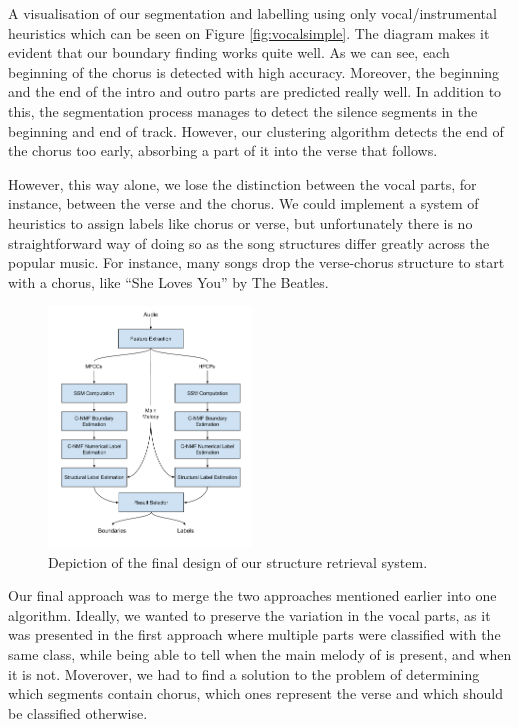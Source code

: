 A visualisation of our segmentation and labelling using only vocal/instrumental heuristics which can be seen on Figure \ref{fig:vocalsimple}. The diagram makes it evident that our boundary finding works quite well. As we can see, each beginning of the chorus is detected with high accuracy. Moreover, the beginning and the end of the intro and outro parts are predicted really well. In addition to this, the segmentation process manages to detect the silence segments in the beginning and end of track. However, our clustering algorithm detects the end of the chorus too early, absorbing a part of it into the verse that follows.

However, this way alone, we lose the distinction between the vocal parts, for instance, between the verse and the chorus. We could implement a system of heuristics to assign labels like chorus or verse, but unfortunately there is no straightforward way of doing so as the song structures differ greatly across the popular music. For instance, many songs drop the verse-chorus structure to start with a chorus, like ``She Loves You'' by The Beatles.

\begin{figure}
\vspace{-30pt}
  \begin{center}
    \includegraphics[width=0.48\textwidth]{Figures/Structure-Retrieval}
  \end{center}
  \caption{Depiction of the final design of our structure retrieval system.}
\label{fig:NMF}
\end{figure}


Our final approach was to merge the two approaches mentioned earlier into one algorithm. Ideally, we wanted to preserve the variation in the vocal parts, as it was presented in the first approach where multiple parts were classified with the same class, while being able to tell when the main melody of is present, and when it is not. Moverover, we had to find a solution to the problem of determining which segments contain chorus, which ones represent the verse and which should be classified otherwise.


